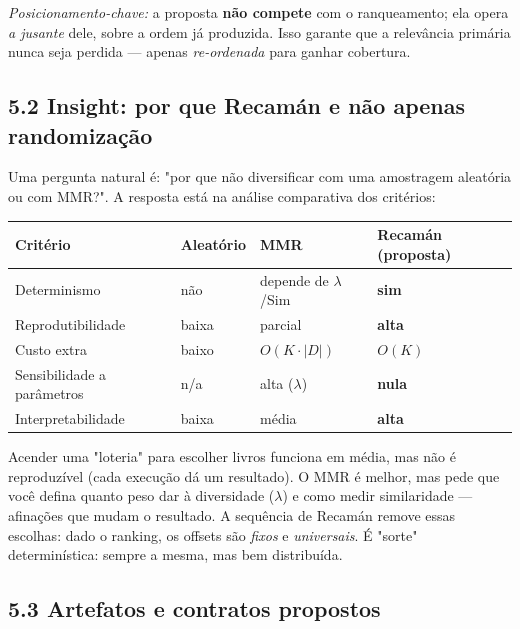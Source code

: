 \begin{pontochave}
\emph{Posicionamento-chave:} a proposta \textbf{não compete} com o ranqueamento;
ela opera \emph{a jusante} dele, sobre a ordem já produzida. Isso garante que a
relevância primária nunca seja perdida --- apenas \emph{re-ordenada} para ganhar
cobertura.
\end{pontochave}

\subsection*{5.2 Insight: por que Recamán e não apenas randomização}

 Uma pergunta natural é: "por que não diversificar com uma amostragem
aleatória ou com MMR?". A resposta está na análise comparativa dos critérios:

\begin{center}
\small
\begin{tabular}{@{}L{0.14\textwidth}L{0.27\textwidth}L{0.27\textwidth}L{0.28\textwidth}@{}}
\toprule
\textbf{Critério} & \textbf{Aleatório} & \textbf{MMR} & \textbf{Recamán (proposta)} \\
\midrule
Determinismo & não & depende de $\lambda$/Sim & \textbf{sim} \\
Reprodutibilidade & baixa & parcial & \textbf{alta} \\
Custo extra & baixo & $O(K \cdot |D|)$ & \textbf{$O(K)$} \\
Sensibilidade a parâmetros & n/a & alta ($\lambda$) & \textbf{nula} \\
Interpretabilidade & baixa & média & \textbf{alta} \\
\bottomrule
\end{tabular}
\end{center}

\begin{intuicao}
Acender uma "loteria" para escolher livros funciona em média, mas não é
reproduzível (cada execução dá um resultado). O MMR é melhor, mas pede que você
defina quanto peso dar à diversidade ($\lambda$) e como medir similaridade ---
afinações que mudam o resultado. A sequência de Recamán remove essas escolhas:
dado o ranking, os offsets são \emph{fixos} e \emph{universais}. É "sorte"
determinística: sempre a mesma, mas bem distribuída.
\end{intuicao}

\subsection*{5.3 Artefatos e contratos propostos}

